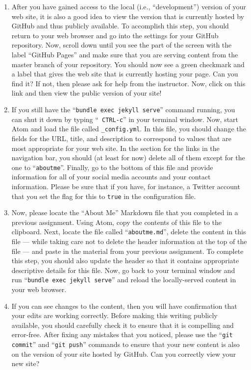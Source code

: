 \begin{enumerate}
  \item After you have gained access to the local (i.e., ``development'') version of your web site, it is also a good
    idea to view the version that is currently hosted by GitHub and thus publicly available. To accomplish this step,
    you should return to your web browser and go into the settings for your GitHub repository. Now, scroll down until
    you see the part of the screen with the label ``GitHub Pages'' and make sure that you are serving content from the
    master branch of your repository. You should now see a green checkmark and a label that gives the web site that is
    currently hosting your page. Can you find it? If not, then please ask for help from the instructor. Now,
    click on this link and then view the public version of your site!

  \item If you still have the ``{\tt bundle exec jekyll serve}'' command running, you can shut it down by typing ``{\tt
    CTRL-c}'' in your terminal window. Now, start Atom and load the file called {\tt \_config.yml}. In this file, you
    should change the fields for the URL, title, and description to correspond to values that are most appropriate for
    your web site. In the section for the links in the navigation bar, you should (at least for now) delete all of them
    except for the one to ``{\tt aboutme}''. Finally, go to the bottom of this file and provide information for all of
    your social media accounts and your contact information. Please be sure that if you have, for instance, a Twitter
    account that you set the flag for this to {\tt true} in the configuration file.

  \item Now, please locate the ``About Me'' Markdown file that you completed in a previous assignment. Using Atom, copy
    the contents of this file to the clipboard. Next, locate the file called ``{\tt aboutme.md}'', delete the content in
    this file --- while taking care not to delete the header information at the top of the file --- and paste in the
    material from your previous assignment. To complete this step, you should also update the header so that it contains
    appropriate descriptive details for this file. Now, go back to your terminal window and run ``{\tt bundle exec
    jekyll serve}'' and reload the locally-served content in your web browser.

  \item If you can see changes to the content, then you will have confirmation that your edits are working correctly.
    Before making this writing publicly available, you should carefully check it to ensure that it is compelling and
    error-free. After fixing any mistakes that you noticed, please use the ``{\tt git commit}'' and ``{\tt git push}''
    commands to ensure that your new content is also on the version of your site hosted by GitHub. Can you correctly
    view your new site?


\end{enumerate}
